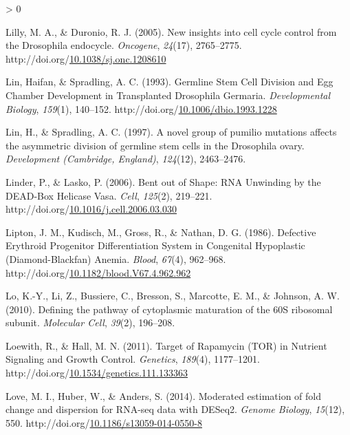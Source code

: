 \documentclass[12pt,oneside]{reedthesis}
\newlength{\cslhangindent}
\newenvironment{CSLReferences}[2] %
 {%
  \setlength{\parindent}{0pt}
  \ifodd #1 \everypar{\setlength{\hangindent}{\cslhangindent}}\ignorespaces\fi
  \ifnum #2 > 0
  \setlength{\parskip}{#2\baselineskip}
  \fi
 }%
 {}
\begin{document}
\begin{CSLReferences}{1}{0}
\leavevmode\hypertarget{ref-Lilly2005d}{}%
Lilly, M. A., \& Duronio, R. J. (2005). New insights into cell cycle control from the {Drosophila} endocycle. \emph{Oncogene}, \emph{24}(17), 2765--2775. http://doi.org/\href{https://doi.org/10.1038/sj.onc.1208610}{10.1038/sj.onc.1208610}

\leavevmode\hypertarget{ref-linGermlineStemCell1993}{}%
Lin, Haifan, \& Spradling, A. C. (1993). Germline {Stem Cell Division} and {Egg Chamber Development} in {Transplanted Drosophila Germaria}. \emph{Developmental Biology}, \emph{159}(1), 140--152. http://doi.org/\href{https://doi.org/10.1006/dbio.1993.1228}{10.1006/dbio.1993.1228}

\leavevmode\hypertarget{ref-Lin1997b}{}%
Lin, H., \& Spradling, A. C. (1997). A novel group of pumilio mutations affects the asymmetric division of germline stem cells in the {Drosophila} ovary. \emph{Development (Cambridge, England)}, \emph{124}(12), 2463--2476.

\leavevmode\hypertarget{ref-Linder2006}{}%
Linder, P., \& Lasko, P. (2006). Bent out of {Shape}: {RNA Unwinding} by the {DEAD-Box Helicase Vasa}. \emph{Cell}, \emph{125}(2), 219--221. http://doi.org/\href{https://doi.org/10.1016/j.cell.2006.03.030}{10.1016/j.cell.2006.03.030}

\leavevmode\hypertarget{ref-liptonDefectiveErythroidProgenitor1986}{}%
Lipton, J. M., Kudisch, M., Gross, R., \& Nathan, D. G. (1986). Defective {Erythroid Progenitor Differentiation System} in {Congenital Hypoplastic} ({Diamond-Blackfan}) {Anemia}. \emph{Blood}, \emph{67}(4), 962--968. http://doi.org/\href{https://doi.org/10.1182/blood.V67.4.962.962}{10.1182/blood.V67.4.962.962}

\leavevmode\hypertarget{ref-Lo2010a}{}%
Lo, K.-Y., Li, Z., Bussiere, C., Bresson, S., Marcotte, E. M., \& Johnson, A. W. (2010). Defining the pathway of cytoplasmic maturation of the {60S} ribosomal subunit. \emph{Molecular Cell}, \emph{39}(2), 196--208.

\leavevmode\hypertarget{ref-loewithTargetRapamycinTOR2011}{}%
Loewith, R., \& Hall, M. N. (2011). Target of {Rapamycin} ({TOR}) in {Nutrient Signaling} and {Growth Control}. \emph{Genetics}, \emph{189}(4), 1177--1201. http://doi.org/\href{https://doi.org/10.1534/genetics.111.133363}{10.1534/genetics.111.133363}

\leavevmode\hypertarget{ref-loveModeratedEstimationFold2014}{}%
Love, M. I., Huber, W., \& Anders, S. (2014). Moderated estimation of fold change and dispersion for {RNA-seq} data with {DESeq2}. \emph{Genome Biology}, \emph{15}(12), 550. http://doi.org/\href{https://doi.org/10.1186/s13059-014-0550-8}{10.1186/s13059-014-0550-8}


\end{CSLReferences}
\end{document}
